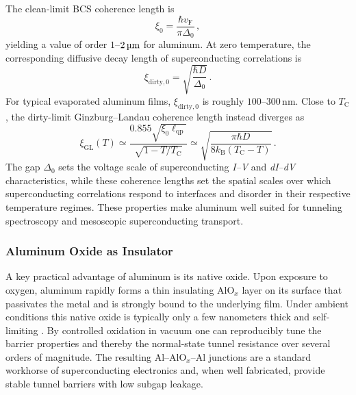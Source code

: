             The clean-limit BCS coherence length is
            \begin{equation}
                \xi_0 = \frac{\hbar v_\mathrm{F}}{\pi\Delta_0}\,,
                \label{eq:basics:aluminum-clean-coherence-length}
            \end{equation}
            yielding a value of order $1$--$2\,\text{\textmu m}$ for aluminum. At zero temperature, the corresponding diffusive decay length of superconducting correlations is
            \begin{equation}
                \xi_{\mathrm{dirty},0}
                = \sqrt{\frac{\hbar D}{\Delta_0}}\,.
                \label{eq:basics:aluminum-dirty-coherence-length}
            \end{equation}
            For typical evaporated aluminum films, $\xi_{\mathrm{dirty},0}$ is roughly $100$--$300\,\mathrm{nm}$. Close to $T_\mathrm{C}$, the dirty-limit Ginzburg--Landau coherence length instead diverges as
            \begin{equation}
                \xi_\mathrm{GL}(T)
                \simeq
                \frac{0.855\sqrt{\xi_0\ell_\mathrm{qp}}}
                     {\sqrt{1-T/T_\mathrm{C}}}
                \simeq
                \sqrt{\frac{\pi\hbar D}
                            {8k_\mathrm{B}(T_\mathrm{C}-T)}}\,.
                \label{eq:basics:aluminum-gl-coherence-length}
            \end{equation}
            The gap $\Delta_0$ sets the voltage scale of superconducting \textit{I--V} and \textit{dI--dV} characteristics, while these coherence lengths set the spatial scales over which superconducting correlations respond to interfaces and disorder in their respective temperature regimes. These properties make aluminum well suited for tunneling spectroscopy and mesoscopic superconducting transport. \cite{tinkham_introduction_2004, murray_material_2021}

        \subsubsection*{Aluminum Oxide as Insulator}

            A key practical advantage of aluminum is its native oxide. Upon exposure to oxygen, aluminum rapidly forms a thin insulating AlO$_x$ layer on its surface that passivates the metal and is strongly bound to the underlying film. Under ambient conditions this native oxide is typically only a few nanometers thick and self-limiting \cite{saif_effect_2002}. By controlled oxidation in vacuum one can reproducibly tune the barrier properties and thereby the normal-state tunnel resistance over several orders of magnitude. The resulting Al--AlO$_x$--Al junctions are a standard workhorse of superconducting electronics and, when well fabricated, provide stable tunnel barriers with low subgap leakage.

